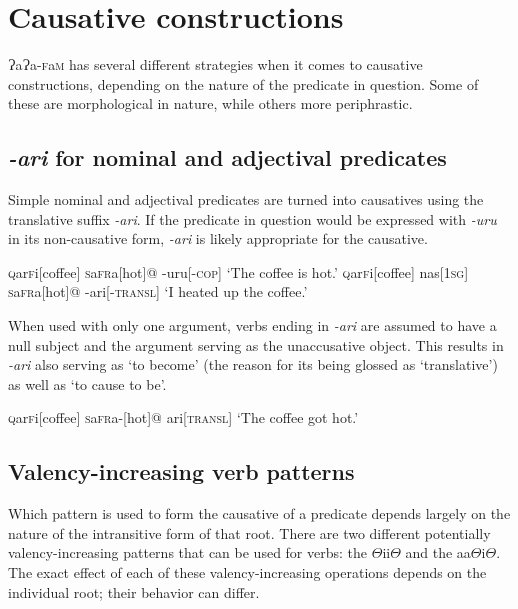 \documentclass[a4paper,10pt,twoside,openright]{memoir}
\newcommand{\lang}{{\bigglot}a{\bigglot}a-\textsc{f}a\textsc{m}}
\newcommand{\rootpart}{$\Theta$}
\newcommand{\bigglot}{Ɂ}
\newcommand{\famwordold}[5]{#1\textsc{#2}#3\textsc{#4}#5}
\begin{document}
\section{Causative constructions}

\lang{} has several different strategies when it comes to causative constructions, depending on the nature of the predicate in question. Some of these are morphological in nature, while others more periphrastic. 

\subsection{\textit{-ari} for nominal and adjectival predicates}

Simple nominal and adjectival predicates are turned into causatives using the translative suffix \textit{-ari}. If the predicate in question would be expressed with \textit{-uru} in its non-causative form, \textit{-ari} is likely appropriate for the causative.

\pex
\a
\begingl
\famwordold{}{q}{ar}{f}{i}[coffee]
\famwordold{}{s}{a}{fr}{a}[hot]@
-uru[\textsc{-cop}]
\glft `The coffee is hot.'
\endgl
\a
\begingl
\famwordold{}{q}{ar}{f}{i}[coffee]
nas[\textsc{1sg}]
\famwordold{}{s}{a}{fr}{a}[hot]@
-ari[-\textsc{transl}]
\glft `I heated up the coffee.'
\endgl
\xe

When used with only one argument, verbs ending in \textit{-ari} are assumed to have a null subject and the argument serving as the unaccusative object. This results in \textit{-ari} also serving as `to become' (the reason for its being glossed as `translative') as well as `to cause to be'.

\ex
\begingl
\famwordold{}{q}{ar}{f}{i}[coffee]
\famwordold{}{s}{a}{fr}{a}-[hot]@
ari[\textsc{transl}]
\glft `The coffee got hot.'
\endgl
\xe

\subsection{Valency-increasing verb patterns}

Which pattern is used to form the causative of a predicate depends largely on the nature of the intransitive form of that root. There are two different potentially valency-increasing patterns that can be used for verbs: the {\rootpart}ii{\rootpart} and the aa{\rootpart}i{\rootpart}. The exact effect of each of these valency-increasing operations depends on the individual root; their behavior can differ.
\end{document}
